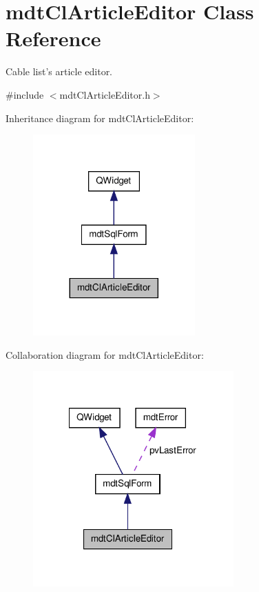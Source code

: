 \hypertarget{classmdt_cl_article_editor}{\section{mdt\-Cl\-Article\-Editor Class Reference}
\label{classmdt_cl_article_editor}
}


Cable list's article editor.  




{\ttfamily \#include $<$mdt\-Cl\-Article\-Editor.\-h$>$}



Inheritance diagram for mdt\-Cl\-Article\-Editor\-:\nopagebreak
\begin{figure}[H]
\begin{center}
\leavevmode
\includegraphics[width=176pt]{classmdt_cl_article_editor__inherit__graph}
\end{center}
\end{figure}


Collaboration diagram for mdt\-Cl\-Article\-Editor\-:\nopagebreak
\begin{figure}[H]
\begin{center}
\leavevmode
\includegraphics[width=218pt]{classmdt_cl_article_editor__coll__graph}
\end{center}
\end{figure}
